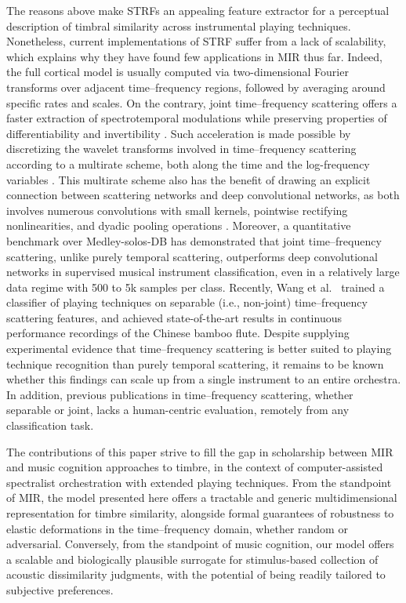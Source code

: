 \documentclass{bmcart}
\makeatletter
\newcommand*{\ie}{i.e.,\@\xspace}
\makeatother
\begin{document}
The reasons above make STRFs an appealing feature extractor for a perceptual description of timbral similarity across instrumental playing techniques.
Nonetheless, current implementations of STRF suffer from a lack of scalability, which explains why they have found few applications in MIR thus far.
Indeed, the full cortical model is usually computed via two-dimensional Fourier transforms over adjacent time--frequency regions, followed by averaging around specific rates and scales.
On the contrary, joint time--frequency scattering offers a faster extraction of spectrotemporal modulations while preserving properties of differentiability \cite{andreux2019jmlr} and invertibility \cite{lostanlen2019dafx}.
Such acceleration is made possible by discretizing the wavelet transforms involved in time--frequency scattering according to a multirate scheme, both along the time and the log-frequency variables \cite{anden2019tsp}.
This multirate scheme also has the benefit of drawing an explicit connection between scattering networks and deep convolutional networks, as both involves numerous convolutions with small kernels, pointwise rectifying nonlinearities, and dyadic pooling operations \cite{mallat2016philtrans}.
Moreover, a quantitative benchmark over Medley-solos-DB has demonstrated that joint time--frequency scattering, unlike purely temporal scattering, outperforms deep convolutional networks in supervised musical instrument classification, even in a relatively large data regime with 500 to 5k samples per class.
Recently, Wang et al.~\cite{wang2019ismir} trained a classifier of playing techniques on separable (\ie{} non-joint) time--frequency scattering features, and achieved state-of-the-art results in continuous performance recordings of the Chinese bamboo flute.
Despite supplying experimental evidence that time--frequency scattering is better suited to playing technique recognition than purely temporal scattering, it remains to be known whether this findings can scale up from a single instrument to an entire orchestra.
In addition, previous publications in time--frequency scattering, whether separable or joint, lacks a human-centric evaluation, remotely from any classification task.

The contributions of this paper strive to fill the gap in scholarship between MIR and music cognition approaches to timbre, in the context of computer-assisted spectralist orchestration with extended playing techniques.
From the standpoint of MIR, the model presented here offers a tractable and generic multidimensional representation for timbre similarity, alongside formal guarantees of robustness to elastic deformations in the time--frequency domain, whether random or adversarial.
Conversely, from the standpoint of music cognition, our model offers a scalable and biologically plausible surrogate for stimulus-based collection of acoustic dissimilarity judgments, with the potential of being readily tailored to subjective preferences.
\end{document}
